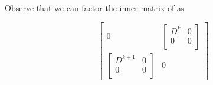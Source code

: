 Observe that we can factor the inner matrix of  as

\begin{dmath}\label{eqn:threeSpringLoopattemptII:660}
\begin{bmatrix}
0 
&
\begin{bmatrix}
D^k & 0 \\
0 &   0 \\
\end{bmatrix} 
\\
\begin{bmatrix}
D^{k+1} & 0 \\
0 &   0 \\
\end{bmatrix} 
&
0  
\end{bmatrix}

\end{dmath}
